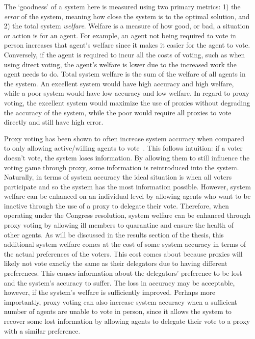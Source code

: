 The `goodness' of a system here is measured using two primary metrics: 1) the
\textit{error} of the system, meaning how close the system is to the optimal
solution, and 2) the total system \textit{welfare}.
Welfare is a measure of how good, or bad, a situation or action is for an agent.
For example, an agent not being required to vote in person increases that agent's
welfare since it makes it easier for the agent to vote.
Conversely, if the agent is required to incur all the costs of voting, such as when
using direct voting, the agent's welfare is lower due to the increased work the agent
needs to do.
Total system welfare is the sum of the welfare of all agents in the system.
An excellent system would have high accuracy and high welfare, while a poor system
would have low accuracy and low welfare.
In regard to proxy voting, the excellent system would maximize the use of proxies
without degrading the accuracy of the system, while the poor would require all
proxies to vote directly and still have high error.

Proxy voting has been shown to often increase system accuracy when compared to only
allowing active/willing agents to vote~\cite{Cohensius2017}.
This follows intuition: if a voter doesn't vote, the system loses information.
By allowing them to still influence the voting game through proxy, some information
is reintroduced into the system.
Naturally, in terms of system accuracy the ideal situation is when all voters
participate and so the system has the most information possible.
However, system welfare can be enhanced on an individual level by allowing agents
who want to be inactive through the use of a proxy to delegate their vote.
Therefore, when operating under the Congress resolution, system welfare can be
enhanced through proxy voting by allowing ill members to quarantine and ensure the
health of other agents.
As will be discussed in the results section of the thesis,
this additional system welfare comes at the cost of some system accuracy in terms of
the actual preferences of the voters.
This cost comes about because proxies will likely not vote exactly the same as their
delegators due to having different preferences.
This causes information about the delegators' preference to be lost and the system's
accuracy to suffer.
The loss in accuracy may be acceptable, however, if the system's welfare is sufficiently
improved.
Perhaps more importantly, proxy voting can also increase system accuracy when a
sufficient number of agents are unable to vote in person, since it allows the system
to recover some lost information by allowing agents to delegate their vote to a proxy
with a similar preference.

